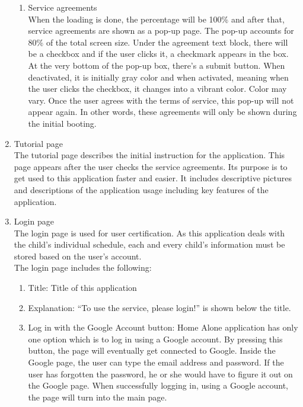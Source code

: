 \documentclass[conference]{IEEEtran}
\begin{document}
\begin{enumerate}[label=\arabic*.]
\begin{enumerate}[label=\alph*.]
        \item {\large{Service agreements}} \\
        When the loading is done, the percentage will be 100\% and after that, service agreements are shown as a pop-up page. The pop-up accounts for 80\% of the total screen size. Under the agreement text block, there will be a checkbox and if the user clicks it, a checkmark appears in the box. At the very bottom of the pop-up box, there’s a submit button. When deactivated, it is initially gray color and when activated, meaning when the user clicks the checkbox, it changes into a vibrant color. Color may vary. Once the user agrees with the terms of service, this pop-up will not appear again. In other words, these agreements will only be shown during the initial booting. \\
    \end{enumerate}
    \item {\large{Tutorial page}} \\
    The tutorial page describes the initial instruction for the application. This page appears after the user checks the service agreements. Its purpose is to get used to this application faster and easier. It includes descriptive pictures and descriptions of the application usage including key features of the application. \\
    \item {\large{Login page}} \\   
    The login page is used for user certification. As this application deals with the child’s individual schedule, each and every child’s information must be stored based on the user’s account. \\      
    The login page includes the following: \\
    \begin{enumerate}[label=\alph*.]
        \item {\large{Title: Title of this application}} \\
        \item {\large{Explanation: “To use the service, please login!” is shown below the title. }} \\
        \item {\large{Log in with the Google Account button: Home Alone application has only one option which is to log in using a Google account. By pressing this button, the page will eventually get connected to Google. Inside the Google page, the user can type the email address and password. If the user has forgotten the password, he or she would have to figure it out on the Google page. When successfully logging in, using a Google account, the page will turn into the main page. }} \\

\end{enumerate}
\end{enumerate}
\end{document}
